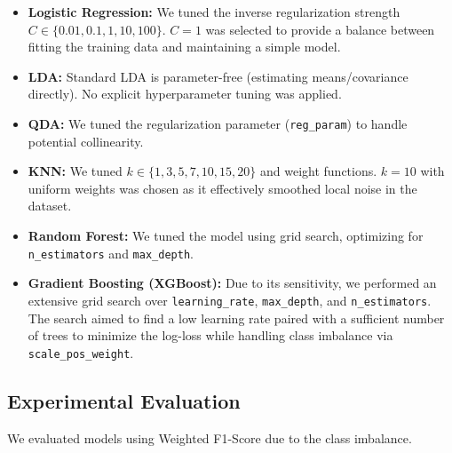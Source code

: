 \documentclass{article}
\begin{document}
\begin{itemize}
    \item \textbf{Logistic Regression:} We tuned the inverse regularization strength $C \in \{0.01, 0.1, 1, 10, 100\}$. $C=1$ was selected to provide a balance between fitting the training data and maintaining a simple model.
    \item \textbf{LDA:} Standard LDA is parameter-free (estimating means/covariance directly). No explicit hyperparameter tuning was applied.
    \item \textbf{QDA:} We tuned the regularization parameter (\texttt{reg\_param}) to handle potential collinearity.
    \item \textbf{KNN:} We tuned $k \in \{1, 3, 5, 7, 10, 15, 20\}$ and weight functions. $k=10$ with uniform weights was chosen as it effectively smoothed local noise in the dataset.
    \item \textbf{Random Forest:} We tuned the model using grid search, optimizing for \texttt{n\_estimators} and \texttt{max\_depth}.
    \item \textbf{Gradient Boosting (XGBoost):} Due to its sensitivity, we performed an extensive grid search over \texttt{learning\_rate}, \texttt{max\_depth}, and \texttt{n\_estimators}. The search aimed to find a low learning rate paired with a sufficient number of trees to minimize the log-loss while handling class imbalance via \texttt{scale\_pos\_weight}. 
\end{itemize}


\subsection{Experimental Evaluation}
We evaluated models using Weighted F1-Score due to the class imbalance.
\end{document}
